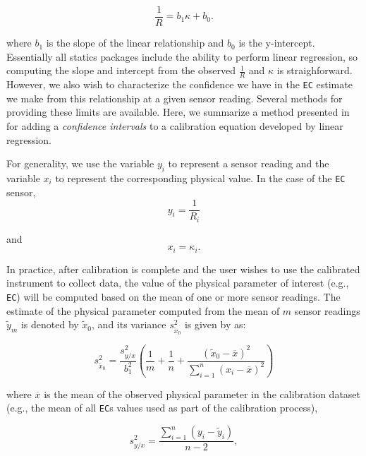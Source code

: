 \begin{equation}\label{eq:linear_calibration}
	\frac{1}{R}=b_1\kappa +b_0.  
\end{equation}

where $b_1$ is the slope of the linear relationship and $b_0$ is the y-intercept. Essentially all statics packages include the ability to perform linear regression, so computing the slope and intercept from the observed $\frac{1}{R}$ and $\kappa$ is straighforward. However, we also wish to characterize the confidence we have in the \texttt{EC} estimate we make from this relationship at a given sensor reading. Several methods for providing these limits are available.  Here, we summarize a method presented in \cite{LAVAGNINI} for adding a \emph{confidence intervals} to a calibration equation developed by linear regression.

For generality, we use the variable $y_i$ to represent a sensor reading and the variable $x_i$ to represent the corresponding physical value.  In the case of the \texttt{EC} sensor, 
\begin{equation}
	y_i = \frac{1}{R_i}  
\end{equation}

and
\begin{equation}
	x_i = \kappa_i.  
\end{equation}


In practice, after calibration is complete and the user wishes to use the calibrated instrument to collect data, the value of the physical parameter of interest (e.g., \texttt{EC}) will be computed based on the mean of one or more sensor readings. The estimate of the physical parameter computed from the mean of $m$ sensor readings $\tilde{y}_m$ is denoted by $\tilde{x}_0$, and its variance $s_{\tilde{x}_0}^{2}$ is given by \cite{LAVAGNINI} as: 

\begin{equation}\label{eq:var_readings}
	s_{\tilde{x}_0}^{2}=\frac{s_{y/x}^{2}}{b_{1}^{2}}\left (\frac{1}{m}+\frac{1}{n}+\frac{(\tilde{x}_0-\overline{x})^2}{\sum\limits_{i=1}^n \left ( x_i-\overline{x} \right )^2} \right )
\end{equation}

where $\overline{x}$ is the mean of the observed physical parameter in the calibration dataset (e.g., the mean of all \texttt{EC}s values used as part of the calibration process),  

\begin{equation}\label{eq:regression_var}
	s_{y/x}^{2}=\frac{\sum\limits_{i=1}^n \left ( y_i-\tilde{y}_i \right )}{n-2},
\end{equation}

